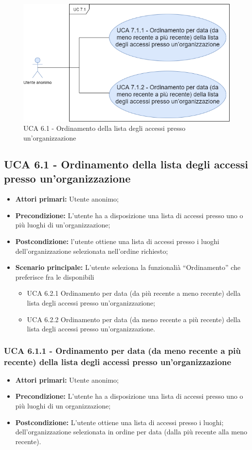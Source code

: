 \begin{figure}[h]
	\centering
	\caption{UCA 6.1 - Ordinamento della lista degli accessi presso un’organizzazione}
	\includegraphics[scale=0.5]{sezioni/UseCase/Immagini/UCA7.1.png}
\end{figure}
\subsection{UCA 6.1 - Ordinamento della lista degli accessi presso un’organizzazione}%
\begin{itemize}
\item \textbf{Attori primari:} Utente anonimo;
\item \textbf{Precondizione:} L’utente ha a disposizione una lista di accessi presso uno o più luoghi di un'organizzazione;
\item \textbf{Postcondizione:} l’utente ottiene una lista di accessi presso i luoghi dell’organizzazione selezionata nell’ordine richiesto;
\item \textbf{Scenario principale:} L’utente seleziona la funzionalià “Ordinamento” che preferisce fra le disponibili
	\begin{itemize}
	\item UCA 6.2.1 Ordinamento per data (da più recente a meno recente) della lista degli accessi presso un’organizzazione;
	\item UCA 6.2.2 Ordinamento per data (da meno recente a più recente) della lista degli accessi presso un’organizzazione.
	\end{itemize}
\end{itemize}

\subsubsection{UCA 6.1.1 - Ordinamento per data (da meno recente a più recente) della lista degli accessi presso un’organizzazione}%
\begin{itemize}
\item \textbf{Attori primari:} Utente anonimo;
\item \textbf{Precondizione:} L’utente ha a disposizione una lista di accessi presso uno o più luoghi di un organizzazione;
\item \textbf{Postcondizione:} L’utente ottiene una lista di accessi presso i luoghi; dell’organizzazione selezionata in ordine per data (dalla più recente alla meno recente).
\end{itemize}

